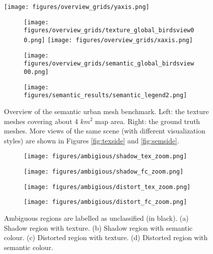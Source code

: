 \begin{figure}[!tb]
	\texttt{[image: figures/overview\_grids/yaxis.png]}
	\begin{subfigure}[t]{0.48\textwidth}
		\texttt{[image: figures/overview\_grids/texture\_global\_birdsview00.png]}
		\texttt{[image: figures/overview\_grids/xaxis.png]}
		\label{fig:textop}
	\end{subfigure}
	\hspace*{\fill}
	\begin{subfigure}[t]{0.48\textwidth}		
		\texttt{[image: figures/overview\_grids/semantic\_global\_birdsview00.png]}
		\vspace*{-0.78cm}
		\begin{center}
		\texttt{[image: figures/semantic\_results/semantic\_legend2.png]}
		\end{center}
		\label{fig:semtop}
	\end{subfigure}
	\vspace*{-0.7cm}
	\caption{Overview of the semantic urban mesh benchmark.
	Left: the texture meshes covering about 4 $km^2$ map area. Right: the ground truth meshes.
	More views of the same scene (with different visualization styles) are shown in Figures \ref{fig:texside} and \ref{fig:semside}.}
	\label{fig:overview}
\end{figure}

\begin{figure}[!tb]
	\centering
	\begin{subfigure}[t]{0.48\textwidth}
		\texttt{[image: figures/ambigious/shadow\_tex\_zoom.png]}
		\caption{}
	\end{subfigure}
	\hspace*{\fill}
	\begin{subfigure}[t]{0.48\textwidth}
		\texttt{[image: figures/ambigious/shadow\_fc\_zoom.png]}
		\caption{}
	\end{subfigure}
	\begin{subfigure}[t]{0.48\textwidth}
		\texttt{[image: figures/ambigious/distort\_tex\_zoom.png]}
		\caption{}
	\end{subfigure}
	\hspace*{\fill}
	\begin{subfigure}[t]{0.48\textwidth}
		\texttt{[image: figures/ambigious/distort\_fc\_zoom.png]}
		\caption{}
	\end{subfigure}
	\caption{Ambiguous regions are labelled as unclassified (in black). 
		(a) Shadow region with texture.
		(b) Shadow region with semantic colour.
		(c) Distorted region with texture.
		(d) Distorted region with semantic colour.} 
	\label{fig:ambigious}
\end{figure}


